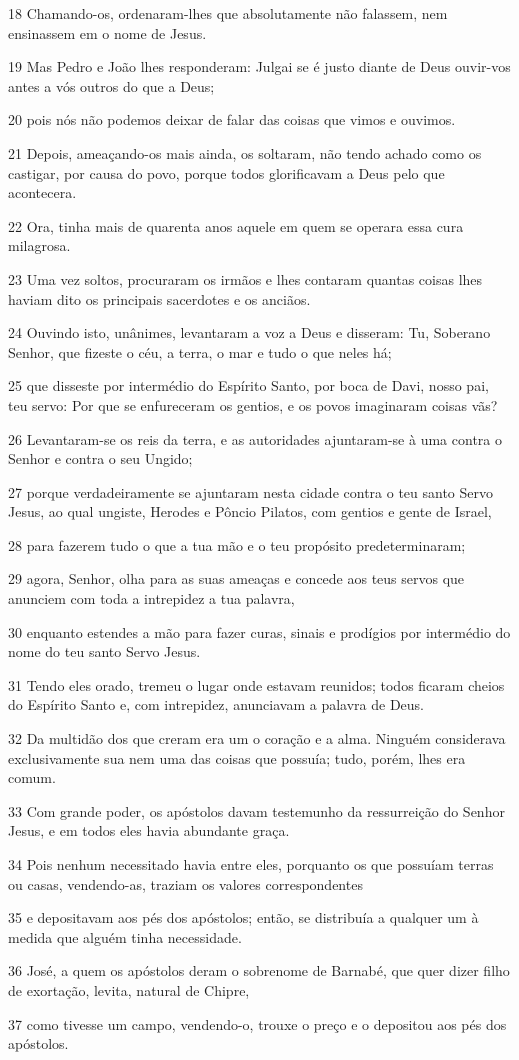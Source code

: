 \par 18 Chamando-os, ordenaram-lhes que absolutamente não falassem, nem ensinassem em o nome de Jesus.
\par 19 Mas Pedro e João lhes responderam: Julgai se é justo diante de Deus ouvir-vos antes a vós outros do que a Deus;
\par 20 pois nós não podemos deixar de falar das coisas que vimos e ouvimos.
\par 21 Depois, ameaçando-os mais ainda, os soltaram, não tendo achado como os castigar, por causa do povo, porque todos glorificavam a Deus pelo que acontecera.
\par 22 Ora, tinha mais de quarenta anos aquele em quem se operara essa cura milagrosa.
\par 23 Uma vez soltos, procuraram os irmãos e lhes contaram quantas coisas lhes haviam dito os principais sacerdotes e os anciãos.
\par 24 Ouvindo isto, unânimes, levantaram a voz a Deus e disseram: Tu, Soberano Senhor, que fizeste o céu, a terra, o mar e tudo o que neles há;
\par 25 que disseste por intermédio do Espírito Santo, por boca de Davi, nosso pai, teu servo: Por que se enfureceram os gentios, e os povos imaginaram coisas vãs?
\par 26 Levantaram-se os reis da terra, e as autoridades ajuntaram-se à uma contra o Senhor e contra o seu Ungido;
\par 27 porque verdadeiramente se ajuntaram nesta cidade contra o teu santo Servo Jesus, ao qual ungiste, Herodes e Pôncio Pilatos, com gentios e gente de Israel,
\par 28 para fazerem tudo o que a tua mão e o teu propósito predeterminaram;
\par 29 agora, Senhor, olha para as suas ameaças e concede aos teus servos que anunciem com toda a intrepidez a tua palavra,
\par 30 enquanto estendes a mão para fazer curas, sinais e prodígios por intermédio do nome do teu santo Servo Jesus.
\par 31 Tendo eles orado, tremeu o lugar onde estavam reunidos; todos ficaram cheios do Espírito Santo e, com intrepidez, anunciavam a palavra de Deus.
\par 32 Da multidão dos que creram era um o coração e a alma. Ninguém considerava exclusivamente sua nem uma das coisas que possuía; tudo, porém, lhes era comum.
\par 33 Com grande poder, os apóstolos davam testemunho da ressurreição do Senhor Jesus, e em todos eles havia abundante graça.
\par 34 Pois nenhum necessitado havia entre eles, porquanto os que possuíam terras ou casas, vendendo-as, traziam os valores correspondentes
\par 35 e depositavam aos pés dos apóstolos; então, se distribuía a qualquer um à medida que alguém tinha necessidade.
\par 36 José, a quem os apóstolos deram o sobrenome de Barnabé, que quer dizer filho de exortação, levita, natural de Chipre,
\par 37 como tivesse um campo, vendendo-o, trouxe o preço e o depositou aos pés dos apóstolos.

